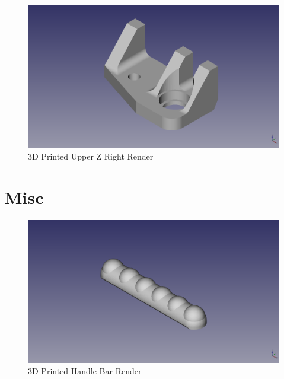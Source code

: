 \begin{figure}[H]
\centering
\includegraphics[keepaspectratio=true,angle=0,height=1.0\textheight,width=1.0\textwidth]{STL/upzright.stl.png}
\caption{3D Printed Upper Z Right Render}
\label{fig:upzrightrender}
\end{figure}

\section{Misc}

\begin{figure}[H]
\centering
\includegraphics[keepaspectratio=true,angle=0,height=1.0\textheight,width=1.0\textwidth]{STL/handlebar.stl.png}
\caption{3D Printed Handle Bar Render}
\label{fig:handlebarrender}
\end{figure}

